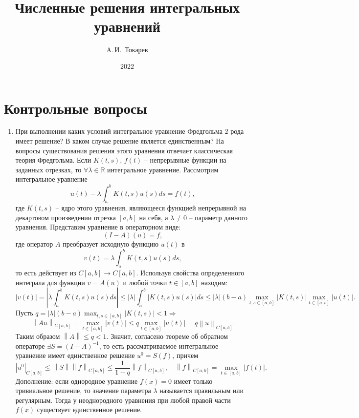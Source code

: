 \documentclass[12pt, a4paper]{article}
\title{Численные решения интегральных уравнений}
\author{A.\,И.~Токарев}
\date{2022}
\newcommand{\norm}[1]{\left\lVert#1\right\rVert}
\begin{document}
\maketitle
\tableofcontents 

\newpage

\section{Контрольные вопросы}

\begin{enumerate}
\item При выполнении каких условий интегральное уравнение Фредгольма 2 рода имеет решение? В каком случае решение является единственным?
На вопросы существования решения этого уравнения отвечает классическая теория Фредгольма.
Если $ K(t, s),\,f(t) $ -- непрерывные функции на заданных отрезках, то $\forall \lambda \in \mathbb{R}$ интегральное уравнение. Рассмотрим интегральное уравнение 
\[
u(t) - \lambda \displaystyle \int_a^b K(t, s) u(s) ds = f(t),
\]
\noindent где $ K(t, s) $ -- ядро этого уравнения, являющееся функцией непрерывной на декартовом произведении отрезка $[a, b]$ на себя, а $ \lambda \neq 0$ -- параметр данного уравнения. Представим уравнение в операторном виде:
\[
(I - A)(u) = f,  
\]
\noindent где оператор $A$ преобразует исходную функцию $ u(t) $ в 
\[
v(t) = \lambda \displaystyle \int_a^b K(t, s)u(s)ds,  
\]
\noindent то есть действует из $C[a,b] \rightarrow C[a, b]$. Используя свойства определенного интеграла для функции $ v = A(u) $ и любой точки $ t \in [a, b] $ находим:
\[
| v(t) | = | \lambda \displaystyle \int_a^b K(t, s)u(s) ds | \leq | \lambda | \displaystyle \int_a^b | K(t, s) u(s) | ds \leq |\lambda|(b-a) \max_{t, s \in [a, b]} | K(t, s) | \max_{t \in [a, b]} |u(t)|.
\]
Пусть $ q = | \lambda |(b-a) \displaystyle \max_{t, s \in [a, b]} | K(t, s) | < 1  \Rightarrow $
\[
\norm{ Au }_{C[a, b]} = \max_{t \in [a, b]} | v(t) | \leq q \max_{ t \in [a, b] } | u(t) | = q \norm{u}_{C[a, b]}.
\]
Таким образом $ \norm{A} \leq q < 1 $. Значит, согласено теореме об обратном операторе $ \exists S = (I - A)^{-1} $, то есть рассматриваемое интегральное уравнение имеет единственное решение $u^0 = S(f)$, причем 
\[
| u^0 |_{C[a, b]} \leq \norm{S} \norm{f}_{C[a, b]} \leq \dfrac{1}{1 - q} \norm{f}_{C[a, b]}, \quad \norm{f}_{C[a, b]} = \max_{t \in [a, b]} |f(t)|.
\]
Дополнение: если однородное уравнение $ f(x) = 0 $ имеет только тривиальное решение, то значение параметра $ \lambda $ называется правильным или регулярным. Тогда у неоднородного уравнения при любой правой части $ f(x) $ существует единственное решение.


\end{enumerate}
\end{document}

